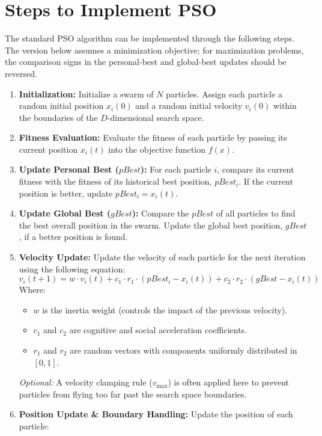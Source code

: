\documentclass[12pt,a4paper]{article}
\begin{document}
\section{Steps to Implement PSO}
The standard PSO algorithm can be implemented through the following steps. The version below assumes a minimization objective; for maximization problems, the comparison signs in the personal-best and global-best updates should be reversed.
\begin{enumerate}
    \item \textbf{Initialization:} Initialize a swarm of $N$ particles. Assign each particle a random initial position $x_i(0)$ and a random initial velocity $v_i(0)$ within the boundaries of the $D$-dimensional search space.
    \item \textbf{Fitness Evaluation:} Evaluate the fitness of each particle by passing its current position $x_i(t)$ into the objective function $f(x)$.
    \item \textbf{Update Personal Best ($pBest$):} For each particle $i$, compare its current fitness with the fitness of its historical best position, $pBest_i$. If the current position is better, update $pBest_i = x_i(t)$.
    \item \textbf{Update Global Best ($gBest$):} Compare the $pBest$ of all particles to find the best overall position in the swarm. Update the global best position, $gBest$, if a better position is found.
    \item \textbf{Velocity Update:} Update the velocity of each particle for the next iteration using the following equation:
    \begin{equation}
        v_i(t+1) = w \cdot v_i(t) + c_1 \cdot r_1 \cdot (pBest_i - x_i(t)) + c_2 \cdot r_2 \cdot (gBest - x_i(t))
    \end{equation}
    Where:
    \begin{itemize}
        \item $w$ is the inertia weight (controls the impact of the previous velocity).
        \item $c_1$ and $c_2$ are cognitive and social acceleration coefficients.
        \item $r_1$ and $r_2$ are random vectors with components uniformly distributed in $[0, 1]$.
    \end{itemize}
    \textit{Optional:} A velocity clamping rule ($v_{\max}$) is often applied here to prevent particles from flying too far past the search space boundaries.
    \item \textbf{Position Update \& Boundary Handling:} Update the position of each particle:

\end{enumerate}
\end{document}
